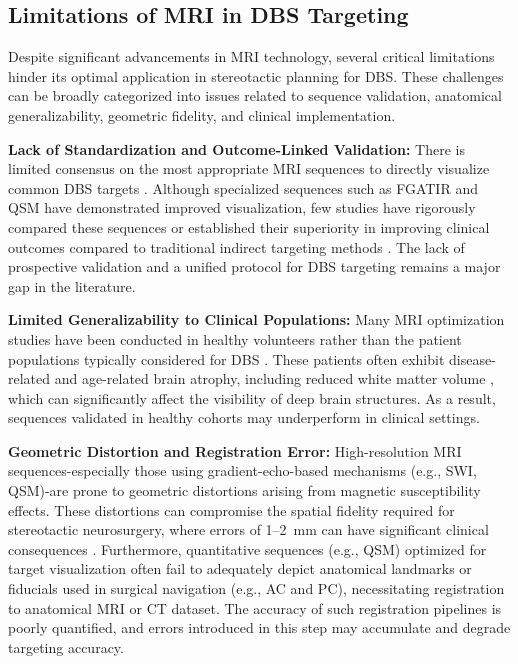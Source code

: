\subsection{Limitations of MRI in DBS Targeting}
\label{sec:MRI_limitations}

Despite significant advancements in MRI technology, several critical limitations hinder its optimal application in stereotactic planning for DBS. These challenges can be broadly categorized into issues related to sequence validation, anatomical generalizability, geometric fidelity, and clinical implementation.

\textbf{Lack of Standardization and Outcome-Linked Validation:} There is limited consensus on the most appropriate MRI sequences to directly visualize common DBS targets \cite{Vitek2010-cn,Middlebrooks2020-vv}. Although specialized sequences such as FGATIR and QSM have demonstrated improved visualization, few studies have rigorously compared these sequences or established their superiority in improving clinical outcomes compared to traditional indirect targeting methods \cite{Boutet2021-vg}. The lack of prospective validation and a unified protocol for DBS targeting remains a major gap in the literature.

\textbf{Limited Generalizability to Clinical Populations:}
Many MRI optimization studies have been conducted in healthy volunteers rather than the patient populations typically considered for DBS \cite{Boutet2021-vg}. These patients often exhibit disease-related and age-related brain atrophy, including reduced white matter volume \cite{Bonneville2005-vl,Lee2011-rf}, which can significantly affect the visibility of deep brain structures. As a result, sequences validated in healthy cohorts may underperform in clinical settings.

\textbf{Geometric Distortion and Registration Error:}
High-resolution MRI sequences-especially those using gradient-echo-based mechanisms (e.g., SWI, QSM)-are prone to geometric distortions arising from magnetic susceptibility effects. These distortions can compromise the spatial fidelity required for stereotactic neurosurgery, where errors of 1--2~mm can have significant clinical consequences \cite{Boutet2021-vg, Rasouli2018-sn, Lau2018-fp}. Furthermore, quantitative sequences (e.g., QSM) optimized for target visualization often fail to adequately depict anatomical landmarks or fiducials used in surgical navigation (e.g., AC and PC), necessitating registration to anatomical MRI or CT dataset. The accuracy of such registration pipelines is poorly quantified, and errors introduced in this step may accumulate and degrade targeting accuracy.

